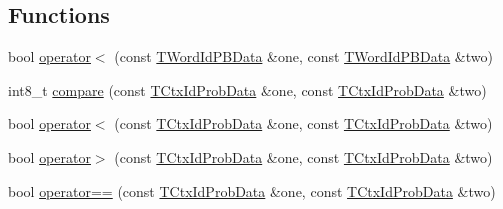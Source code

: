\subsection*{Functions}
\begin{DoxyCompactItemize}
\item 
bool \hyperlink{namespaceuva_1_1smt_1_1bpbd_1_1server_1_1lm_1_1_____c2_w_array_trie_adb90cfa23dc758f324dc21c5f7ee1307}{operator$<$} (const \hyperlink{structuva_1_1smt_1_1bpbd_1_1server_1_1lm_1_1_____c2_w_array_trie_1_1_t_word_id_p_b_data}{T\+Word\+Id\+P\+B\+Data} \&one, const \hyperlink{structuva_1_1smt_1_1bpbd_1_1server_1_1lm_1_1_____c2_w_array_trie_1_1_t_word_id_p_b_data}{T\+Word\+Id\+P\+B\+Data} \&two)
\item 
int8\+\_\+t \hyperlink{namespaceuva_1_1smt_1_1bpbd_1_1server_1_1lm_1_1_____c2_w_array_trie_a513652b265146140d708ab51fe228c8c}{compare} (const \hyperlink{structuva_1_1smt_1_1bpbd_1_1server_1_1lm_1_1_____c2_w_array_trie_1_1_t_ctx_id_prob_data}{T\+Ctx\+Id\+Prob\+Data} \&one, const \hyperlink{structuva_1_1smt_1_1bpbd_1_1server_1_1lm_1_1_____c2_w_array_trie_1_1_t_ctx_id_prob_data}{T\+Ctx\+Id\+Prob\+Data} \&two)
\item 
bool \hyperlink{namespaceuva_1_1smt_1_1bpbd_1_1server_1_1lm_1_1_____c2_w_array_trie_aa66ad35cb3a0b2e806a1add9315697fe}{operator$<$} (const \hyperlink{structuva_1_1smt_1_1bpbd_1_1server_1_1lm_1_1_____c2_w_array_trie_1_1_t_ctx_id_prob_data}{T\+Ctx\+Id\+Prob\+Data} \&one, const \hyperlink{structuva_1_1smt_1_1bpbd_1_1server_1_1lm_1_1_____c2_w_array_trie_1_1_t_ctx_id_prob_data}{T\+Ctx\+Id\+Prob\+Data} \&two)
\item 
bool \hyperlink{namespaceuva_1_1smt_1_1bpbd_1_1server_1_1lm_1_1_____c2_w_array_trie_ae42b69355b336c9bd2639f0ed2316173}{operator$>$} (const \hyperlink{structuva_1_1smt_1_1bpbd_1_1server_1_1lm_1_1_____c2_w_array_trie_1_1_t_ctx_id_prob_data}{T\+Ctx\+Id\+Prob\+Data} \&one, const \hyperlink{structuva_1_1smt_1_1bpbd_1_1server_1_1lm_1_1_____c2_w_array_trie_1_1_t_ctx_id_prob_data}{T\+Ctx\+Id\+Prob\+Data} \&two)
\item 
bool \hyperlink{namespaceuva_1_1smt_1_1bpbd_1_1server_1_1lm_1_1_____c2_w_array_trie_a042b571ef861faf12071f1fda94134a2}{operator==} (const \hyperlink{structuva_1_1smt_1_1bpbd_1_1server_1_1lm_1_1_____c2_w_array_trie_1_1_t_ctx_id_prob_data}{T\+Ctx\+Id\+Prob\+Data} \&one, const \hyperlink{structuva_1_1smt_1_1bpbd_1_1server_1_1lm_1_1_____c2_w_array_trie_1_1_t_ctx_id_prob_data}{T\+Ctx\+Id\+Prob\+Data} \&two)
\end{DoxyCompactItemize}


